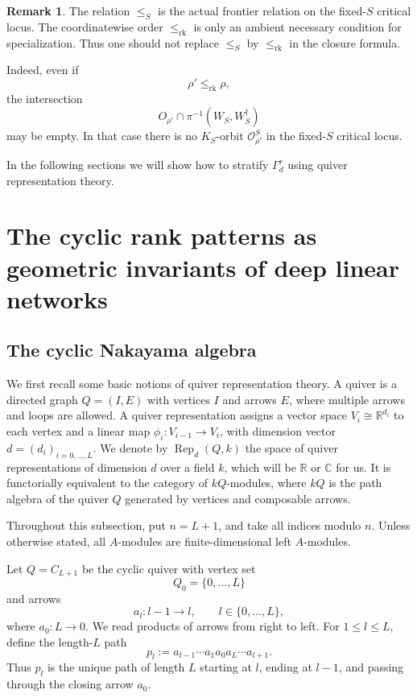 \documentclass[11pt]{article}
\theoremstyle{definition}
\newtheorem{remark}[theorem]{Remark}
\begin{document}
\begin{remark}
The relation \(\leq_S\) is the actual frontier relation on the fixed-\(S\)
critical locus. The coordinatewise order \(\leq_{\mathrm{rk}}\) is only an
ambient necessary condition for specialization. Thus one should not replace
\(\leq_S\) by \(\leq_{\mathrm{rk}}\) in the closure formula.

Indeed, even if
\[
\rho'\leq_{\mathrm{rk}}\rho,
\]
the intersection
\[
O_{\rho'}\cap\pi^{-1}(W_S,W_S^{\dagger})
\]
may be empty. In that case there is no \(K_S\)-orbit
\(\mathcal O_{\rho'}^S\) in the fixed-\(S\) critical locus.
\end{remark}

In the following sections we will show how to stratify \(\Gamma_d^r\) using quiver representation theory.
\section{The cyclic rank patterns as geometric invariants of deep linear networks}
\subsection{The cyclic Nakayama algebra}
We first recall some basic notions of quiver representation theory. A quiver is a directed graph \(Q=(I,E)\) with vertices \(I\) and arrows \(E\), where multiple arrows and loops are allowed. A quiver representation assigns a vector space \(V_i \cong \mathbb{R}^{d_i}\) to each vertex and a linear map \(\phi_i: V_{i-1} \to V_i\), with dimension vector \(d=(d_i)_{i=0,\ldots,L}\). We denote by \(\operatorname{Rep}_d(Q,k)\) the space of quiver representations of dimension \(d\) over a field \(k\), which will be \(\mathbb{R}\) or \(\mathbb{C}\) for us. It is functorially equivalent to the category of \(kQ\)-modules, where \(kQ\) is the path algebra of the quiver \(Q\) generated by vertices and composable arrows.


Throughout this subsection, put \(n=L+1\), and take all indices modulo
\(n\). Unless otherwise stated, all \(A\)-modules are finite-dimensional
left \(A\)-modules.

Let \(Q=C_{L+1}\) be the cyclic quiver with vertex set
\[
Q_0=\{0,\ldots,L\}
\]
and arrows
\[
a_l:l-1\longrightarrow l,
\qquad l\in \{0,\ldots,L\},
\]
where \(a_0:L\to 0\). We read products of arrows from right to left. For
\(1\leq l\leq L\), define the length-\(L\) path
\[
p_l:=a_{l-1}\cdots a_1a_0a_L\cdots a_{l+1}.
\]
Thus \(p_l\) is the unique path of length \(L\) starting at \(l\), ending
at \(l-1\), and passing through the closing arrow \(a_0\).
\end{document}
